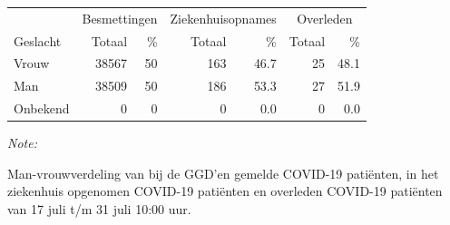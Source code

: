 \documentclass[
  english,
  man,floatsintext]{apa6}
\begin{document}
\begin{table}
\centering\begingroup\fontsize{11}{13}\selectfont

\begin{threeparttable}
\begin{tabular}{lrrrrrr}
\toprule
\multicolumn{1}{c}{ } & \multicolumn{2}{c}{Besmettingen} & \multicolumn{2}{c}{Ziekenhuisopnames} & \multicolumn{2}{c}{Overleden} \\
\cmidrule(l{3pt}r{3pt}){2-3} \cmidrule(l{3pt}r{3pt}){4-5} \cmidrule(l{3pt}r{3pt}){6-7}
Geslacht & Totaal & \% & Totaal & \% & Totaal & \%\\
\midrule
Vrouw & 38567 & 50 & 163 & 46.7 & 25 & 48.1\\
Man & 38509 & 50 & 186 & 53.3 & 27 & 51.9\\
Onbekend & 0 & 0 & 0 & 0.0 & 0 & 0.0\\
\bottomrule
\end{tabular}
\begin{tablenotes}
\item \textit{Note: } 
\item Man-vrouwverdeling van bij de GGD’en gemelde COVID-19 patiënten, in het ziekenhuis opgenomen COVID-19 patiënten en overleden COVID-19 patiënten van 17 juli t/m 31 juli 10:00 uur.
\end{tablenotes}
\end{threeparttable}
\endgroup{}
\end{table}
\newpage
\end{document}
